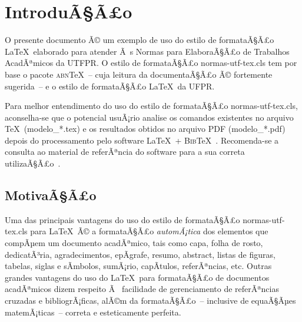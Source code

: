 \documentclass[openright]{normas-utf-tex} %
\begin{document}
%
%
%
%

\newcommand\extraPages{0}
\setcounter{savepage}{\value{page}+\extraPages}
\setcounter{page}{\value{savepage}}


\chapter{IntroduÃ§Ã£o}
\label{chap:introducao}

O presente documento Ã© um exemplo de uso do estilo de formataÃ§Ã£o \LaTeX\ elaborado para atender Ã s Normas para ElaboraÃ§Ã£o de Trabalhos AcadÃªmicos da UTFPR. O estilo de formataÃ§Ã£o {\ttfamily normas-utf-tex.cls} tem por base o pacote \textsc{abn}\TeX~-- cuja leitura da documentaÃ§Ã£o \cite{abnTeX2009} Ã© fortemente sugerida~-- e o estilo de formataÃ§Ã£o \LaTeX\ da UFPR.

Para melhor entendimento do uso do estilo de formataÃ§Ã£o {\ttfamily normas-utf-tex.cls}, aconselha-se que o potencial usuÃ¡rio analise os comandos existentes no arquivo \TeX\ ({\ttfamily modelo\_*.tex}) e os resultados obtidos no arquivo PDF ({\ttfamily modelo\_*.pdf}) depois do processamento pelo software \LaTeX\ + \textsc{Bib}\TeX~\cite{LaTeX2009,BibTeX2009}. Recomenda-se a consulta ao material de referÃªncia do software para a sua correta utilizaÃ§Ã£o~\cite{Lamport1986,Buerger1989,Kopka2003,Mittelbach2004}.

\section{MotivaÃ§Ã£o}
\label{sec:motivacao}

Uma das principais vantagens do uso do estilo de formataÃ§Ã£o {\ttfamily normas-utf-tex.cls} para \LaTeX\ Ã© a formataÃ§Ã£o \textit{automÃ¡tica} dos elementos que compÃµem um documento acadÃªmico, tais como capa, folha de rosto, dedicatÃ³ria, agradecimentos, epÃ­grafe, resumo, abstract, listas de figuras, tabelas, siglas e sÃ­mbolos, sumÃ¡rio, capÃ­tulos, referÃªncias, etc. Outras grandes vantagens do uso do \LaTeX\ para formataÃ§Ã£o de documentos acadÃªmicos dizem respeito Ã  facilidade de gerenciamento de referÃªncias cruzadas e bibliogrÃ¡ficas, alÃ©m da formataÃ§Ã£o~-- inclusive de equaÃ§Ãµes  matemÃ¡ticas~-- correta e esteticamente perfeita.
\end{document}
